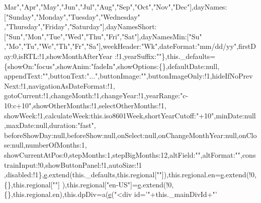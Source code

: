 \begin{DoxyCode}
{      Mar"},\textcolor{stringliteral}{"Apr"},\textcolor{stringliteral}{"May"},\textcolor{stringliteral}{"Jun"},\textcolor{stringliteral}{"Jul"},\textcolor{stringliteral}{"Aug"},\textcolor{stringliteral}{"Sep"},\textcolor{stringliteral}{"Oct"},\textcolor{stringliteral}{"Nov"},\textcolor{stringliteral}{"Dec"}],dayNames:[\textcolor{stringliteral}{"Sunday"},\textcolor{stringliteral}{"Monday"},\textcolor{stringliteral}{"Tuesday"},\textcolor{stringliteral}{"Wednesday"}
      ,\textcolor{stringliteral}{"Thursday"},\textcolor{stringliteral}{"Friday"},\textcolor{stringliteral}{"Saturday"}],dayNamesShort:[\textcolor{stringliteral}{"Sun"},\textcolor{stringliteral}{"Mon"},\textcolor{stringliteral}{"Tue"},\textcolor{stringliteral}{"Wed"},\textcolor{stringliteral}{"Thu"},\textcolor{stringliteral}{"Fri"},\textcolor{stringliteral}{"Sat"}],dayNamesMin:[\textcolor{stringliteral}{"Su"}
      ,\textcolor{stringliteral}{"Mo"},\textcolor{stringliteral}{"Tu"},\textcolor{stringliteral}{"We"},\textcolor{stringliteral}{"Th"},\textcolor{stringliteral}{"Fr"},\textcolor{stringliteral}{"Sa"}],weekHeader:\textcolor{stringliteral}{"Wk"},dateFormat:\textcolor{stringliteral}{"mm/dd/yy"},firstDay:0,isRTL:!1,showMonthAfterYear
      :!1,yearSuffix:\textcolor{stringliteral}{""}\},this.\_defaults=\{showOn:\textcolor{stringliteral}{"focus"},showAnim:\textcolor{stringliteral}{"fadeIn"},showOptions:\{\},defaultDate:null,
      appendText:\textcolor{stringliteral}{""},buttonText:\textcolor{stringliteral}{"..."},buttonImage:\textcolor{stringliteral}{""},buttonImageOnly:!1,hideIfNoPrevNext:!1,navigationAsDateFormat:!1,
      gotoCurrent:!1,changeMonth:!1,changeYear:!1,yearRange:\textcolor{stringliteral}{"c-10:c+10"},showOtherMonths:!1,selectOtherMonths:!1,
      showWeek:!1,calculateWeek:this.iso8601Week,shortYearCutoff:\textcolor{stringliteral}{"+10"},minDate:null,maxDate:null,duration:\textcolor{stringliteral}{"fast"},
      beforeShowDay:null,beforeShow:null,onSelect:null,onChangeMonthYear:null,onClose:null,numberOfMonths:1,
      showCurrentAtPos:0,stepMonths:1,stepBigMonths:12,altField:\textcolor{stringliteral}{""},altFormat:\textcolor{stringliteral}{""},constrainInput:!0,showButtonPanel:!1,autoSize:!1
      ,disabled:!1\},\hyperlink{jquery-ui_8min_8js_a2c038346d47955cbe2cb91e338edd7e1}{e}.extend(this.\_defaults,this.regional[\textcolor{stringliteral}{""}]),this.regional.en=\hyperlink{jquery-ui_8min_8js_a2c038346d47955cbe2cb91e338edd7e1}{e}.extend(!0,\{\},this.regional[\textcolor{stringliteral}{""}]
      ),this.regional[\textcolor{stringliteral}{"en-US"}]=\hyperlink{jquery-ui_8min_8js_a2c038346d47955cbe2cb91e338edd7e1}{e}.extend(!0,\{\},this.regional.en),this.dpDiv=a(\hyperlink{jquery-ui_8min_8js_a2c038346d47955cbe2cb91e338edd7e1}{e}(\textcolor{stringliteral}{"<div id='"}+this.\_mainDivId+\textcolor{stringliteral}{"'
}
\end{DoxyCode}
